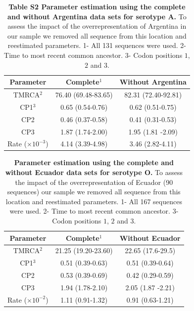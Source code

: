 \documentclass[a4paper,10pt]{article}
\begin{document}
\begin{table}[h]
\caption*{ {{\bf Table S2 Parameter estimation using the complete and without Argentina data sets for serotype A.}} To assess the impact of the overrepresentation of Argentina in our sample we removed all sequence from this location and reestimated parameters.
1- All 131 sequences were used. 2- Time to most recent common ancestor. 3- Codon positions $1$, $2$ and $3$. }
\begin{center}
\begin{tabular}{ccc}
\toprule
Parameter	&Complete$^{1}$	&Without Argentina\\
\midrule
TMRCA$^{2}$	&76.40 (69.48-83.65)	&82.31 (72.40-92.81)\\
CP1$	^{3}$	&0.65 (0.54-0.76)	&0.62 (0.51-0.75)\\
CP2	&0.46 (0.37-0.58)	&0.41 (0.31-0.53)\\
CP3	&1.87 (1.74-2.00)	& 1.95 (1.81 -2.09)\\
Rate ($\times 10^{-3}$)	&4.14 (3.39-4.98)	&3.46 (2.82-4.11)\\
\bottomrule
\end{tabular}
\end{center}
\label{tab:SB_A}
 \end{table}


\begin{table}[h]
\caption{ {{\bf Parameter estimation using the complete and without Ecuador data sets for serotype O.}} To assess the impact of the overrepresentation of Ecuador (90 sequences) our sample we removed all sequence from this location and reestimated parameters.
1- All 167 sequences were used. 2- Time to most recent common ancestor. 3- Codon positions $1$, $2$ and $3$.
}
\begin{center}
\begin{tabular}{ccc}
\toprule
Parameter	&Complete$^{1}$	&Without Ecuador\\
\midrule
TMRCA$^{2}$	&21.25 (19.20-23.60)	&22.65 (17.6-29.5)\\
CP1$^{3}$	&0.51 (0.39-0.63)	&0.51 (0.39-0.64)\\
CP2	&0.53 (0.39-0.69)	&0.42 (0.29-0.59)\\
CP3	&1.94 (1.78-2.10)	& 2.05 (1.87 -2.21)\\
Rate ($\times 10^{-2}$)	&1.11 (0.91-1.32)	&0.91 (0.63-1.21)\\
\bottomrule
\end{tabular}
\end{center}
\label{tab:SB_O}
 \end{table}
\end{document}
